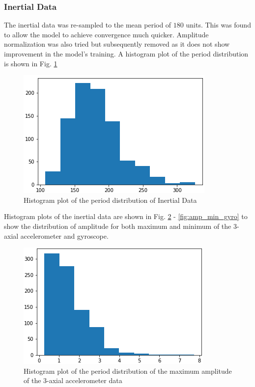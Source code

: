 \documentclass[conference]{IEEEtran}
\begin{document}
\subsubsection{Inertial Data}
The inertial data was re-sampled to the mean period of $180$ units. This was found to allow the model to achieve convergence much quicker. Amplitude normalization was also tried but subsequently removed as it does not show improvement in the model's training. A histogram plot of the period distribution is shown in Fig. \ref{fig:period_hist}

\begin{figure}[H]
\begin{center}
\includegraphics[scale=0.4]{period_hist.png}
\end{center}
\caption{\label{fig:period_hist} 
Histogram plot of the period distribution of Inertial Data}
\end{figure}
Histogram plots of the inertial data are shown in Fig. \ref{fig:amp_max_acc} - \ref{fig:amp_min_gyro} to show the distribution of amplitude for both maximum and minimum of the 3-axial accelerometer and gyroscope.
\begin{figure}[H]
\begin{center}
\includegraphics[scale=0.4]{amp_max_acc_hist.png}
\end{center}
\caption{\label{fig:amp_max_acc} 
Histogram plot of the period distribution of the maximum amplitude of the 3-axial accelerometer data}
\end{figure}
\end{document}
